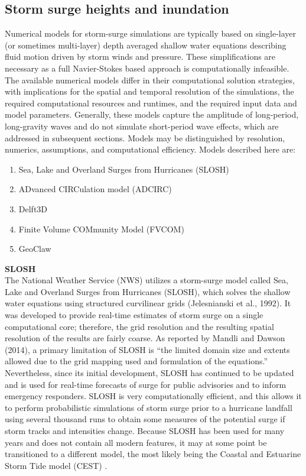 \subsection{Storm surge heights and inundation}

Numerical models for storm-surge simulations are typically based on single-layer (or sometimes multi-layer) depth averaged shallow water equations describing fluid motion driven by storm winds and pressure. These simplifications are necessary as a full Navier-Stokes based approach is computationally infeasible. The available numerical models differ in their computational solution strategies, with implications for the spatial and temporal resolution of the simulations, the required computational resources and runtimes, and the required input data and model parameters. Generally, these models capture the amplitude of long-period, long-gravity waves and do not simulate short-period wave effects, which are addressed in subsequent sections. Models may be distinguished by resolution, numerics, assumptions, and computational efficiency. Models described here are:

\begin{enumerate}
    \item Sea, Lake and Overland Surges from Hurricanes  (SLOSH)
    \item ADvanced CIRCulation model (ADCIRC)
    \item Delft3D 
    \item Finite Volume COMmunity Model (FVCOM)
    \item GeoClaw
\end{enumerate}

\noindent\textbf{SLOSH} \\The National Weather Service (NWS) utilizes a storm-surge model called Sea, Lake and Overland Surges from Hurricanes (SLOSH), which solves the shallow water equations using structured curvilinear grids (Jelesnianski et al., 1992). It was developed to provide real-time estimates of storm surge on a single computational core; therefore, the grid resolution and the resulting spatial resolution of the results are fairly coarse. As reported by Mandli and Dawson (2014), a primary limitation of SLOSH is “the limited domain size and extents allowed due to the grid mapping used and formulation of the equations.” Nevertheless, since its initial development, SLOSH has continued to be updated and is used for real-time forecasts of surge for public advisories and to inform emergency responders. SLOSH is very computationally efficient, and this allows it to perform probabilistic simulations of storm surge prior to a hurricane landfall using several thousand runs to obtain some measures of the potential surge if storm tracks and intensities change. Because SLOSH has been used for many years and does not contain all modern features, it may at some point be transitioned to a different model, the most likely being the Coastal and Estuarine Storm Tide model (CEST) \citep{zhang2017transition}. 
\newline


